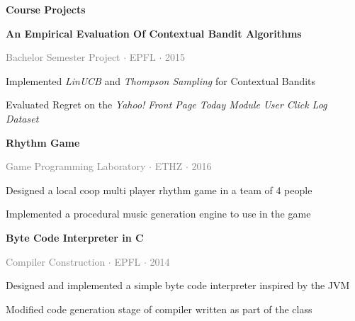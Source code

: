 \documentclass[10pt, a4paper]{article}
\begin{document}
\begin{trivlist}
\item \textcolor{Mahogany}{{\textbf{\Large Course Projects}}}
    \noindent{}
    \begin{trivlist}
    \item 
        \begin{trivlist}
        \item \textbf{An Empirical Evaluation Of Contextual Bandit Algorithms}
        \item \textcolor{Gray}{Bachelor Semester Project $\cdot$ EPFL $\cdot$ 2015}
        \item Implemented \textit{LinUCB} and \textit{Thompson Sampling} for 
            Contextual Bandits
        \item Evaluated Regret on the \textit{Yahoo! Front Page Today Module User Click Log Dataset}
        \end{trivlist}
    \item
    \item
        \begin{trivlist}
        \item \textbf{Rhythm Game}
        \item \textcolor{Gray}{Game Programming Laboratory $\cdot$ ETHZ $\cdot$ 2016}
        \item Designed a local coop multi player rhythm game in a team of 4 people
        \item Implemented a procedural music generation engine to use in the game
        \end{trivlist}
    \item
    \item
        \begin{trivlist}
        \item \textbf{Byte Code Interpreter in C}
        \item \textcolor{Gray}{Compiler Construction $\cdot$ EPFL $\cdot$ 2014}
        \item Designed and implemented a simple byte code interpreter inspired by the JVM
        \item Modified code generation stage of compiler written as part of the class
        \end{trivlist}
    \end{trivlist}


\end{trivlist}
\end{document}
